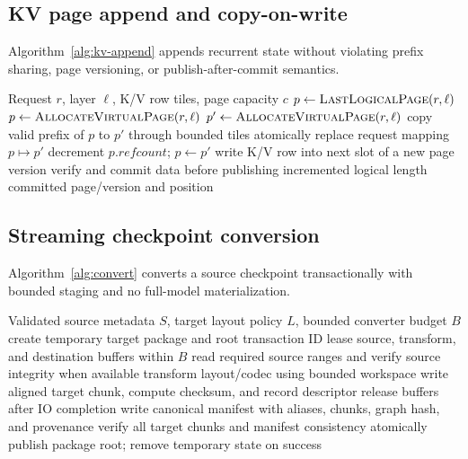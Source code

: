 \subsection{KV page append and copy-on-write}

Algorithm~\ref{alg:kv-append} appends recurrent state without violating prefix sharing, page versioning, or publish-after-commit semantics.

\begin{algorithm}[H]
\caption{Append one token's KV state}
\label{alg:kv-append}
\begin{algorithmic}[1]
\Require Request $r$, layer $\ell$, K/V row tiles, page capacity $c$
\State $p\gets\Call{LastLogicalPage}{r,\ell}$
  \State $p\gets\Call{AllocateVirtualPage}{r,\ell}$
  \State $p'\gets\Call{AllocateVirtualPage}{r,\ell}$
  \State copy valid prefix of $p$ to $p'$ through bounded tiles
  \State atomically replace request mapping $p\mapsto p'$
  \State decrement $p.refcount$; $p\gets p'$
\EndIf
\State write K/V row into next slot of a new page version
\State verify and commit data before publishing incremented logical length
\State \Return committed page/version and position
\end{algorithmic}
\end{algorithm}

\subsection{Streaming checkpoint conversion}

Algorithm~\ref{alg:convert} converts a source checkpoint transactionally with bounded staging and no full-model materialization.

\begin{algorithm}[H]
\caption{Convert a checkpoint to AMS packed format without full materialization}
\label{alg:convert}
\begin{algorithmic}[1]
\Require Validated source metadata $S$, target layout policy $L$, bounded converter budget $B$
\State create temporary target package and root transaction ID
    \State lease source, transform, and destination buffers within $B$
    \State read required source ranges and verify source integrity when available
    \State transform layout/codec using bounded workspace
    \State write aligned target chunk, compute checksum, and record descriptor
    \State release buffers after IO completion
  \EndFor
\EndFor
\State write canonical manifest with aliases, chunks, graph hash, and provenance
\State verify all target chunks and manifest consistency
\State atomically publish package root; remove temporary state on success
\end{algorithmic}
\end{algorithm}

